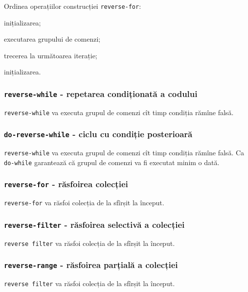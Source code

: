 Ordinea operațiilor construcției \lstinline|reverse-for|:
\begin{icEnum}
	\item inițializarea;
	\item executarea grupului de comenzi;
	\item trecerea la următoarea iterație;
	\item inițializarea.
\end{icEnum}

\subsubsection{\lstinline|reverse-while| - repetarea condiționată a codului}

\lstinline|reverse-while| va executa grupul de comenzi cît timp condiția rămîne falsă.

\subsubsection{\lstinline|do-reverse-while| - ciclu cu condiție posterioară}

\lstinline|reverse-while| va executa grupul de comenzi cît timp condiția rămîne falsă. Ca \lstinline|do-while| garantează că grupul de comenzi va fi executat minim o dată.

\subsubsection{\lstinline|reverse-for| - răsfoirea colecției}

\lstinline|reverse-for| va răsfoi colecția de la sfîrșit la început.

\subsubsection{\lstinline|reverse-filter| - răsfoirea selectivă a colecției}

\lstinline|reverse filter| va răsfoi colecția de la sfîrșit la început.

\subsubsection{\lstinline|reverse-range| - răsfoirea parțială a colecției}

\lstinline|reverse filter| va răsfoi colecția de la sfîrșit la început.

